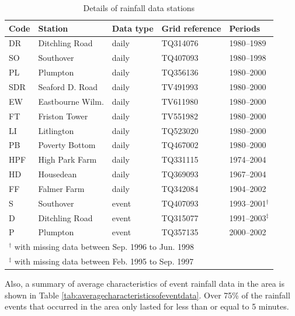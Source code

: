 \begin{table}[htbp]
  \centering
  \caption{Details of rainfall data stations}
  \label{tab:DetailsOfDataStations}
    \small
    \begin{tabular}{lllll}
      \toprule
      \textbf{Code} & \textbf{Station} & \textbf{Data type} &
\textbf{Grid reference} & \textbf{Periods}\\
      \midrule
      DR & Ditchling Road & daily & TQ314076 & 1980--1989\\
      SO & Southover & daily & TQ407093 & 1980--1998\\
      PL & Plumpton & daily & TQ356136 & 1980--2000\\
      SDR & Seaford D. Road & daily & TV491993 & 1980--2000\\
      EW & Eastbourne Wilm. & daily & TV611980 & 1980--2000\\
      FT & Friston Tower & daily & TV551982 & 1980--2000\\
      LI & Litlington & daily & TQ523020 & 1980--2000\\
      PB & Poverty Bottom & daily & TQ467002 & 1980--2000\\
      HPF & High Park Farm & daily & TQ331115 & 1974--2004\\
      HD & Housedean & daily & TQ369093 & 1967--2004\\
      FF & Falmer Farm & daily & TQ342084 & 1904--2002\\
      S & Southover & event & TQ407093 &
1993--2001$^\dagger$\\
      D & Ditchling Road & event & TQ315077 &
1991--2003$^\ddagger$\\
      P & Plumpton & event & TQ357135 & 2000--2002\\
      \bottomrule
      \multicolumn{5}{l}{\footnotesize $^\dagger$  with
missing data between Sep. 1996 to Jun. 1998}\\
      \multicolumn{5}{l}{\footnotesize $^\ddagger$  with
missing data between Feb. 1995 to Sep. 1997}
    \end{tabular}
\end{table}

Also, a summary of average characteristics of event rainfall data in the area is
shown in Table \ref{tab:averagecharacteristicsofeventdata}. Over 75\% of the
rainfall events that occurred in the area only lasted for less than or
equal to 5 minutes.

